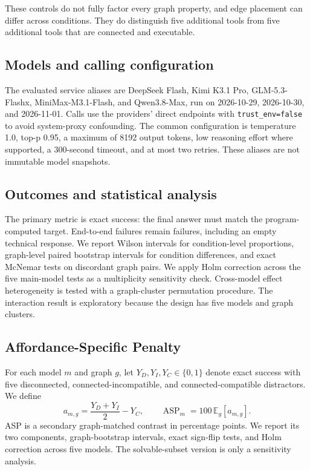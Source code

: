 \documentclass[twoside,11pt,preprint]{article}
\begin{document}
These controls do not fully factor every graph property, and edge placement can
differ across conditions. They do distinguish five additional tools from five
additional tools that are connected and executable.

\subsection{Models and calling configuration}
The evaluated service aliases are DeepSeek Flash, Kimi K3.1 Pro,
GLM-5.3-Flashx, MiniMax-M3.1-Flash, and Qwen3.8-Max, run on 2026-10-29,
2026-10-30, and 2026-11-01. Calls use the
providers' direct endpoints with \texttt{trust\_env=false} to avoid
system-proxy confounding. The common configuration is temperature 1.0, top-p
0.95, a maximum of 8192 output tokens, low reasoning effort where supported, a
300-second timeout, and at most two retries. These aliases are not immutable
model snapshots.

\subsection{Outcomes and statistical analysis}
The primary metric is exact success: the final answer must match the
program-computed target. End-to-end failures remain failures, including an empty
technical response. We report Wilson intervals for condition-level proportions,
graph-level paired bootstrap intervals for condition differences, and exact
McNemar tests on discordant graph pairs. We apply Holm correction across the five
main-model tests as a multiplicity sensitivity check. Cross-model effect
heterogeneity is tested with a graph-cluster permutation procedure. The
interaction result is exploratory because the design has five models and
\MainGraphClusters{} graph clusters.

\subsection{Affordance-Specific Penalty}
For each model \(m\) and graph \(g\), let \(Y_D,Y_I,Y_C\in\{0,1\}\) denote exact
success with five disconnected, connected-incompatible, and
connected-compatible distractors. We define
\begin{equation}
a_{m,g}=\frac{Y_D+Y_I}{2}-Y_C,
\qquad
\operatorname{ASP}_m=100\,\mathbb{E}_g[a_{m,g}].
\end{equation}
ASP is a secondary graph-matched contrast in percentage points. We report its
two components, graph-bootstrap intervals, exact sign-flip tests, and Holm
correction across five models. The solvable-subset version is only a
sensitivity analysis.
\end{document}
